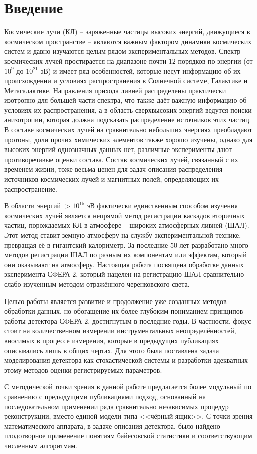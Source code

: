 \chapter*{Введение}

Космические лучи (КЛ) -- заряженные частицы высоких энергий, движущиеся в космическом пространстве -- являются важным фактором динамики космических систем и давно изучаются целым рядом экспериментальных методов. Спектр космических лучей простирается на диапазоне почти $12$ порядков по энергии (от $10^{9}$ до $10^{21}$ эВ) и имеет ряд особенностей, которые несут информацию об их происхождении и условиях распространения в Солнечной системе, Галактике и Метагалактике. Направления прихода ливней распределены практически изотропно для большей части спектра, что также даёт важную информацию об условиях их распространения, а в область сверхвысоких энергий ведутся поиски анизотропии, которая должна подсказать распределение источников этих частиц. В составе космических лучей на сравнительно небольших энергиях преобладают протоны, доли прочих химических элементов также хорошо изучены, однако для высоких энергий однозначных данных нет, различные эксперименты дают противоречивые оценки состава. Состав космических лучей, связанный с их временем жизни, тоже весьма ценен для задач описания распределения источников космических лучей и магнитных полей, определяющих их распространение.

В области энергий $> 10^{15}$ эВ фактически единственным способом изучения космических лучей является непрямой метод регистрации каскадов вторичных частиц, порождаемых КЛ в атмосфере -- широких атмосферных ливней (ШАЛ). Этот метод ставит земную атмосферу на службу экспериментальной технике, превращая её в гигантский калориметр. За последние $50$ лет разработано много методов регистрации ШАЛ по разным их компонентам или эффектам, который они оказывают на атмосферу. Настоящая работа посвящена обработке данных эксперимента СФЕРА-2, который нацелен на регистрацию ШАЛ сравнительно слабо изученным методом отражённого черенковского света.

Целью работы является развитие и продолжение уже созданных методов обработки данных, но обогащение их более глубоким пониманием принципов работы детектора СФЕРА-2, достигнутым в последние годы. В частности, фокус стоит на количественном измерении инструментальных неопределённостей, вносимых в процессе измерения, которые в предыдущих публикациях описывались лишь в общих чертах. Для этого была поставлена задача моделирования детектора как стохастической системы и разработки адекватных этому методов оценки регистрируемых параметров.

С методической точки зрения в данной работе предлагается более модульный по сравнению с предыдущими публикациями подход, основанный на последовательном применении ряда сравнительно независимых процедур реконструкции, вместо единой модели типа <<чёрный ящик>>. С точки зрения математического аппарата, в задаче описания детектора, было найдено плодотворное применение понятиям байесовской статистики и соответствующим численным алгоритмам.
